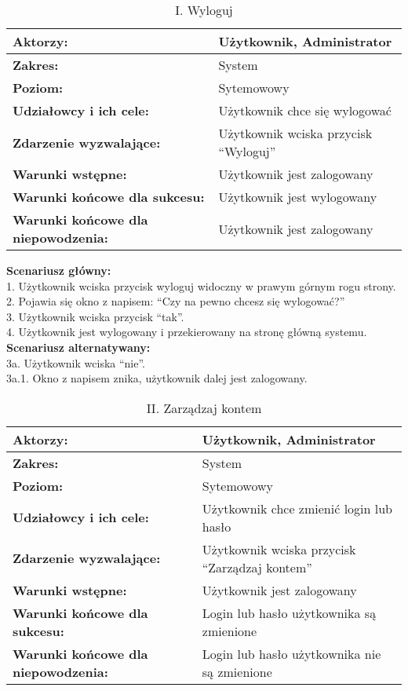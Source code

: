 	\begin{table}[H]
\centering
\caption{I. Wyloguj}
\label{wyloguj}
\begin{tabular}{|p{7cm}|p{7cm}|}
  \hline 
  \textbf{Aktorzy:} & Użytkownik, Administrator\\
  \hline
  \textbf{Zakres:} & System \\
	\hline
  \textbf{Poziom:} & Sytemowowy \\
	\hline
  \textbf{Udziałowcy i ich cele: } & Użytkownik chce się wylogować \\
	\hline
  \textbf{Zdarzenie wyzwalające: } & Użytkownik wciska przycisk “Wyloguj” \\
	\hline
  \textbf{Warunki wstępne: } & Użytkownik jest zalogowany
 \\
	\hline
  \textbf{Warunki końcowe dla sukcesu:} & Użytkownik jest wylogowany
 \\
	\hline
  \textbf{Warunki końcowe dla niepowodzenia:} & Użytkownik jest zalogowany \\
  \hline
\end{tabular} 
\end{table}

\textbf{Scenariusz główny:} \\
1. Użytkownik wciska przycisk wyloguj widoczny w prawym górnym rogu strony. \\
2. Pojawia się okno z napisem: “Czy na pewno chcesz się wylogować?” \\
3. Użytkownik wciska przycisk “tak”. \\
4. Użytkownik jest wylogowany i przekierowany na stronę główną systemu. \\
\textbf{Scenariusz alternatywany:}\\ 
3a. Użytkownik wciska “nie”. \\
3a.1. Okno z napisem znika, użytkownik dalej jest zalogowany. \\
\newpage
\begin{table}[H]
\centering
\caption{II. Zarządzaj kontem}
\label{zarzadzajkontem}
\begin{tabular}{|p{7cm}|p{7cm}|}
  \hline 
  \textbf{Aktorzy:} & Użytkownik, Administrator\\
  \hline
  \textbf{Zakres:} & System \\
	\hline
  \textbf{Poziom:} & Sytemowowy \\
	\hline
  \textbf{Udziałowcy i ich cele: } & Użytkownik chce zmienić login lub hasło \\
	\hline
  \textbf{Zdarzenie wyzwalające: } & Użytkownik wciska przycisk “Zarządzaj kontem” \\
	\hline
  \textbf{Warunki wstępne: } & Użytkownik jest zalogowany\\
	\hline
  \textbf{Warunki końcowe dla sukcesu:} & Login lub hasło użytkownika są zmienione\\
	\hline
  \textbf{Warunki końcowe dla niepowodzenia:} & Login lub hasło użytkownika nie są zmienione \\
  \hline
\end{tabular} 
\end{table}

